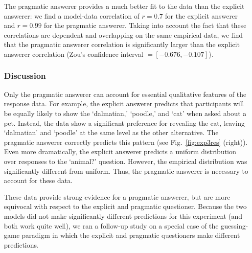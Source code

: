 \documentclass[12pt, floatsintext, jou]{apa6}
\begin{document}
The pragmatic answerer provides a much better fit to the data than the explicit answerer: we find a model-data correlation of $r = 0.7$ for the explicit answerer and $r = 0.99$ for the pragmatic answerer.  Taking into account the fact that these correlations are dependent and overlapping on the same empirical data, we find that the pragmatic answerer correlation is significantly larger than the explicit answerer correlation (Zou's confidence interval $= [-0.676, -0.107]$). 


\subsubsection{Discussion}

Only the pragmatic answerer can account for essential qualitative features of the response data. For example, the explicit answerer predicts that participants will be equally likely to show the `dalmatian,' `poodle,' and `cat' when asked about a pet. Instead, the data show a significant preference for revealing the cat, leaving `dalmatian' and `poodle' at the same level as the other alternative. The pragmatic answerer correctly predicts this pattern  (see Fig.~\ref{fig:exp3res} (right)). Even more dramatically, the explicit answerer predicts a uniform distribution over responses to the `animal?' question. %
However, the empirical distribution was significantly different from uniform. Thus, the pragmatic answerer is necessary to account for these data.

These data provide strong evidence for a pragmatic answerer, but are more equivocal with respect to the explicit and pragmatic questioner. Because the two models did not make significantly different predictions for this experiment (and both work quite well), we ran a follow-up study on a special case of the guessing-game paradigm in which the explicit and pragmatic questioners make different predictions.
\end{document}
